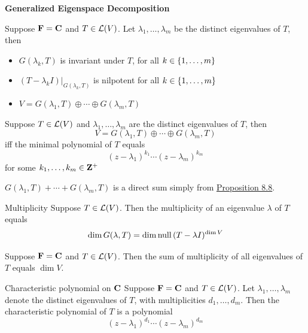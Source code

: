 \documentclass[12pt,a4paper]{article}
\begin{document}
    \begin{prop}\label{8.13}
        \textbf{Generalized Eigenspace Decomposition}

        Suppose $\mathbf{F}=\mathbf{C}$ and $T\in\mathcal{L}(V)$. Let $\lambda_1,\dots,\lambda_m$ be the distinct eigenvalues of $T$, then

        \begin{itemize}
            \item $G(\lambda_k,T)$ is invariant under $T$, for all $k\in\left\{1,\dots,m\right\}$
            \item $(T-\lambda_k I)|_{G(\lambda_k,T)}$ is nilpotent for all $k\in\left\{1,\dots,m\right\}$
            \item $V=G(\lambda_1,T)\oplus\cdots\oplus G(\lambda_m,T)$
        \end{itemize}
    \end{prop}
    \begin{prop}
        Suppose $T\in\mathcal{L}(V)$ and $\lambda_1,\dots,\lambda_m$ are the distinct eigenvalues of $T$, then
        $$
        V=G(\lambda_1,T)\oplus\cdots\oplus G(\lambda_m,T)
        $$
        iff the minimal polynomial of $T$ equals
        $$
        (z-\lambda_1)^{k_1}\cdots(z-\lambda_m)^{k_m}
        $$
        for some $k_1,\dots,k_m\in\mathbf{Z}^+$
    \end{prop}
    \begin{remark}
        $G(\lambda_1,T)+\cdots+G(\lambda_m,T)$ is a direct sum simply from \hyperref[8.8]{Proposition 8.8}. 
    \end{remark}
    \hfill

    \begin{defi}{Multiplicity}
        Suppose $T\in\mathcal{L}(V)$. Then the multiplicity of an eigenvalue $\lambda$ of $T$ equals
        $$
        \dim G(\lambda,T)=\dim\operatorname{null\,}(T-\lambda I)^{\dim V}
        $$
    \end{defi}
    \begin{prop}
        Suppose $\mathbf{F}=\mathbf{C}$ and $T\in\mathcal{L}(V)$. Then the sum of multiplicity of all eigenvalues of $T$ equals $\dim V$.
    \end{prop}
    \hfill

    \begin{defi}{Characteristic polynomial on $\mathbf{C}$}
        Suppose $\mathbf{F}=\mathbf{C}$ and $T\in\mathcal{L}(V)$. Let $\lambda_1,\dots,\lambda_m$ denote the distinct eigenvalues of $T$, with multiplicities $d_1,\dots,d_m$. Then the characteristic polynomial of $T$ is a polynomial
        $$
        (z-\lambda_1)^{d_1}\cdots(z-\lambda_m)^{d_m}
        $$
    \end{defi}
    \hfill
\end{document}
